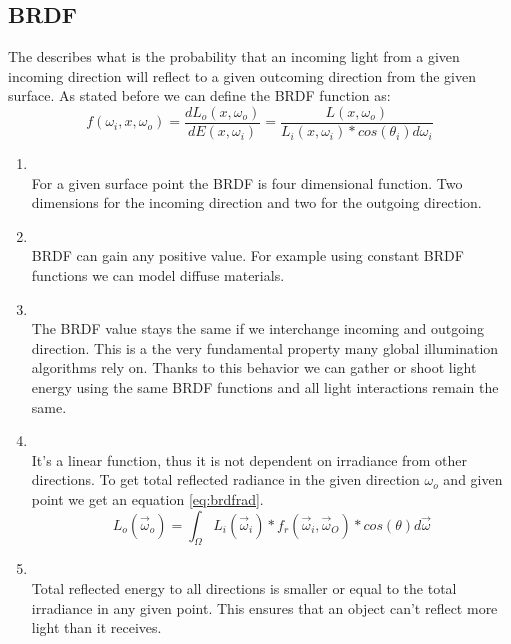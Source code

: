\subsection{BRDF}
The  describes what is the probability that an incoming light from a given incoming direction will reflect to a given outcoming direction from the given surface. As stated before we can define the BRDF function as:
\begin{equation}
f(\omega_{i},x,\omega_{o})=\frac{dL_{o}(x,\omega_{o})}{dE(x,\omega_{i})}=\frac{L(x,\omega_{o})}{L_{i}(x,\omega_{i})*cos(\theta_{i})d\omega_{i}}
\end{equation}

 \begin{enumerate}
\item {}\\
For a given surface point  the BRDF is four dimensional function. Two dimensions for the incoming direction and two for the outgoing direction.

\item {}\\
BRDF can gain any positive value. For example using constant BRDF functions we can model diffuse materials.

\item {}\\
The BRDF value stays the same if we interchange incoming and outgoing direction. This is a the very fundamental property many global illumination algorithms rely on. Thanks to this behavior we can gather or shoot light energy using the same BRDF functions and all light interactions remain the same. 

\item {}\\
It's a linear function, thus it is not dependent on irradiance from other directions. To get total reflected radiance in the given direction $\omega_{o}$ and given point we get an equation \ref{eq:brdfrad}.
 \begin{equation}
L_{o}(\vec\omega_{o})=\int_{\Omega}L_{i}(\vec\omega_{i})*f_{r}(\vec\omega_{i},\vec\omega_{O})*cos(\theta)d\vec\omega
\label{eq:brdfrad} 
\end{equation}

\item {}\\
Total reflected energy to all directions is smaller or equal to the total irradiance in any given point. This ensures that an object can't reflect more light than it receives. 

\end{enumerate}

